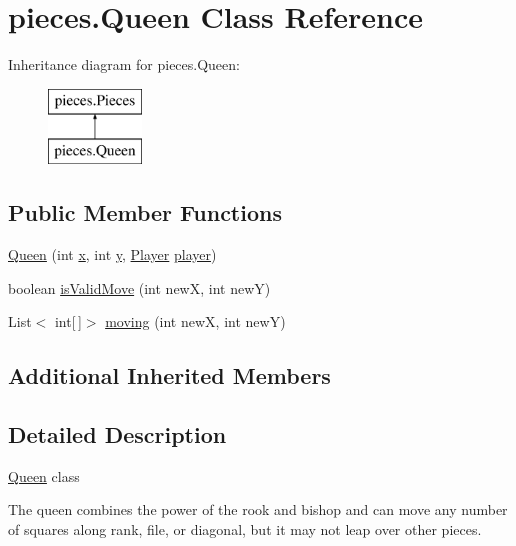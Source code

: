 \hypertarget{classpieces_1_1_queen}{}\section{pieces.\+Queen Class Reference}
\label{classpieces_1_1_queen}
Inheritance diagram for pieces.\+Queen\+:\begin{figure}[H]
\begin{center}
\leavevmode
\includegraphics[height=2.000000cm]{classpieces_1_1_queen}
\end{center}
\end{figure}
\subsection*{Public Member Functions}
\begin{DoxyCompactItemize}
\item 
\mbox{\hyperlink{classpieces_1_1_queen_a330bbe8bd6a75147004ed3267b0b422f}{Queen}} (int \mbox{\hyperlink{classpieces_1_1_pieces_ac5178f9b8a6b0c4235851475081249f3}{x}}, int \mbox{\hyperlink{classpieces_1_1_pieces_a66d911734967a8ced1b9792fe900fadb}{y}}, \mbox{\hyperlink{classgame_1_1_player}{Player}} \mbox{\hyperlink{classpieces_1_1_pieces_a49f35044dd36e5c4b04261a8ea54ad0c}{player}})
\item 
boolean \mbox{\hyperlink{classpieces_1_1_queen_a12c3d1bc54998da5947802f70070378f}{is\+Valid\+Move}} (int newX, int newY)
\item 
List$<$ int\mbox{[}$\,$\mbox{]}$>$ \mbox{\hyperlink{classpieces_1_1_queen_a2e0d378c18cf3fd85dc1acf860294950}{moving}} (int newX, int newY)
\end{DoxyCompactItemize}
\subsection*{Additional Inherited Members}


\subsection{Detailed Description}
\mbox{\hyperlink{classpieces_1_1_queen}{Queen}} class 

The queen combines the power of the rook and bishop and can move any number of squares along rank, file, or diagonal, but it may not leap over other pieces. 


